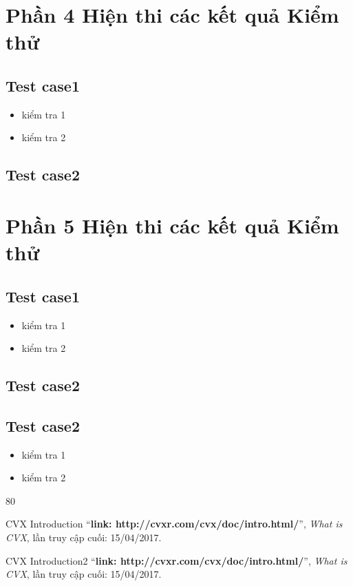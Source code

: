 \documentclass[a4paper]{article}
\begin{document}
 \section{Phần 4 Hiện thi các kết quả Kiểm thử}
    \subsection{Test case1}
    \begin{itemize}
         \item kiểm tra 1
        \item  kiểm tra 2
    \end{itemize}
       

    \subsection{Test case2}
   


 \section{Phần 5 Hiện thi các kết quả Kiểm thử}
    \subsection{Test case1}
    \begin{itemize}
         \item kiểm tra 1
        \item  kiểm tra 2
    \end{itemize}
       

    \subsection{Test case2}
	


	\subsection{Test case2}
		\begin{itemize}
			\item kiểm tra 1
			\item  kiểm tra 2
    	\end{itemize}
   

\begin{thebibliography}{80}

CVX Introduction
``\textbf{link: http://cvxr.com/cvx/doc/intro.html/}'',
\textit{What is CVX}, lần truy cập cuối: 15/04/2017.

CVX Introduction2
``\textbf{link: http://cvxr.com/cvx/doc/intro.html/}'',
\textit{What is CVX}, lần truy cập cuối: 15/04/2017.

\end{thebibliography}
\end{document}
